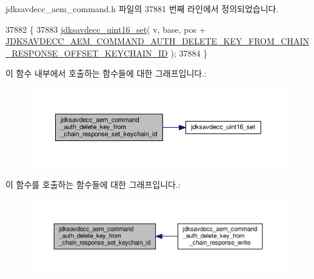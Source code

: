 jdksavdecc\+\_\+aem\+\_\+command.\+h 파일의 37881 번째 라인에서 정의되었습니다.


\begin{DoxyCode}
37882 \{
37883     \hyperlink{group__endian_ga14b9eeadc05f94334096c127c955a60b}{jdksavdecc\_uint16\_set}( v, base, pos + 
      \hyperlink{group__command__auth__delete__key__from__chain__response_gaf36fe9443e53b439212c599f8a186ca5}{JDKSAVDECC\_AEM\_COMMAND\_AUTH\_DELETE\_KEY\_FROM\_CHAIN\_RESPONSE\_OFFSET\_KEYCHAIN\_ID}
       );
37884 \}
\end{DoxyCode}


이 함수 내부에서 호출하는 함수들에 대한 그래프입니다.\+:
\nopagebreak
\begin{figure}[H]
\begin{center}
\leavevmode
\includegraphics[width=350pt]{group__command__auth__delete__key__from__chain__response_gac1598617db3a583f1ba0e4e646fe3769_cgraph}
\end{center}
\end{figure}




이 함수를 호출하는 함수들에 대한 그래프입니다.\+:
\nopagebreak
\begin{figure}[H]
\begin{center}
\leavevmode
\includegraphics[width=350pt]{group__command__auth__delete__key__from__chain__response_gac1598617db3a583f1ba0e4e646fe3769_icgraph}
\end{center}
\end{figure}


